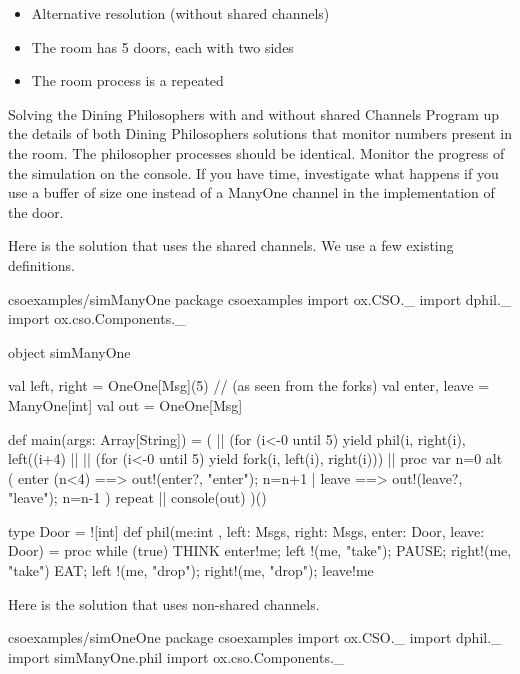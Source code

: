 \documentclass{concdistfoils}
\begin{document}
\begin{slide}
\begin{itemize}
\item Alternative resolution (without shared channels)
\begin{center}
\end{center}
\vfill
\item The room has 5 doors, each with two sides
\item The room process is a repeated 
\end{itemize}
\begin{exercises}

\begin{ex**}{Solving the Dining Philosophers with and without shared Channels}
Program up the details of both Dining Philosophers solutions that 
monitor numbers present in the room. The philosopher processes should
be identical. Monitor the progress of the simulation
on the console. If you have time, investigate what happens if 
you use a buffer of size one instead of a ManyOne channel
in the implementation of the door.
\begin{ans}
Here is the solution that uses the shared channels. We use a few existing definitions.
\begin{obj}{csoexamples/simManyOne}
package csoexamples
import  ox.CSO._
import  dphil._
import  ox.cso.Components._

object simManyOne
{ val left, right   = OneOne[Msg](5) // (as seen from the forks)
  val enter, leave  = ManyOne[int]
  val out = OneOne[Msg]
  
  def main(args: Array[String]) =
  { (  || (for (i<-0 until 5) yield phil(i, right(i),  left((i+4)%
    || || (for (i<-0 until 5) yield fork(i, left(i),   right(i)))
    || proc
       { var n=0
         alt ( enter (n<4) ==> { out!(enter?, "enter"); n=n+1 } 
             | leave       ==> { out!(leave?, "leave"); n=n-1 } 
             ) repeat 
       }
    || console(out)
    )()
  }
  
  type Door = ![int]
  def phil(me:int , left: Msgs, right: Msgs, enter: Door, leave: Door) = proc
  { while (true)
    { THINK
      enter!me; left !(me, "take"); PAUSE; right!(me, "take")
      EAT; 
      left !(me, "drop"); right!(me, "drop"); leave!me
    }
  }  
}
\end{obj}
\end{ans}
\begin{ans*}
Here is the solution that uses non-shared channels.
\begin{obj}{csoexamples/simOneOne}
package csoexamples
import  ox.CSO._
import  dphil._ 
import  simManyOne.phil
import  ox.cso.Components._


\end{obj}
\end{ans*}
\end{ex**}
\end{exercises}
\end{slide}
\end{document}

